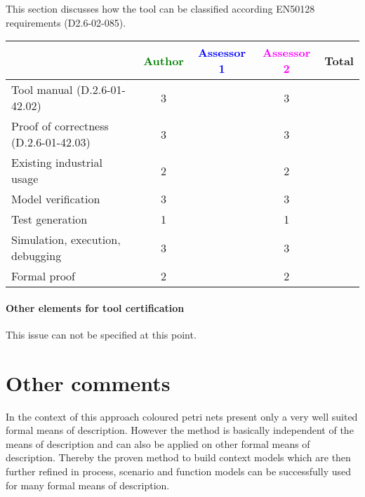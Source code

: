 This section discusses how the tool can be classified according EN50128 requirements (D2.6-02-085).


\begin{tabular}{|l | c | c | c | c|}
\hline
& \textcolor{green}{Author} & \textcolor{blue}{Assessor 1} & \textcolor{magenta}{Assessor 2} & Total \\
\hline 
Tool manual (D.2.6-01-42.02) & 3 & & 3 &  \\
\hline
Proof of correctness (D.2.6-01-42.03)   & 3  & & 3 & \\
\hline
Existing industrial  usage  & 2 & & 2 & \\
\hline
Model verification & 3 & & 3 & \\
\hline
Test generation & 1 & & 1 & \\
\hline
Simulation, execution, debugging & 3 & & 3 & \\
\hline
Formal proof & 2 & & 2 & \\
\hline
\end{tabular}


\paragraph{Other elements for tool certification}
This issue can not be specified at this point.


\section{Other comments}
In the context of this approach coloured petri nets present only a very well suited formal means of description. However the method is basically independent of the means of description and can also be applied on other formal means of description. Thereby the proven method to build context models which are then further refined in process, scenario and function models can be successfully used for many formal means of description. 



